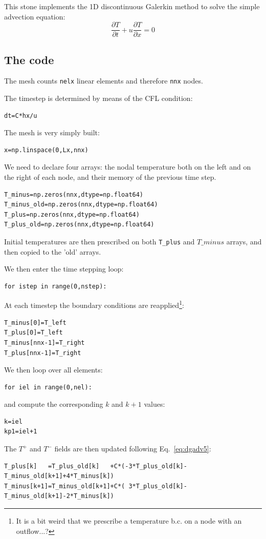

This stone implements the 1D discontinuous Galerkin method to solve the simple 
advection equation:
\[
\frac{\partial T}{\partial t} + u \frac{\partial T}{\partial x} = 0
\]




\subsection*{The code}

The mesh counts {\tt nelx} linear elements and therefore {\tt nnx} nodes.

The timestep is determined by means of the CFL condition:
\begin{lstlisting}
dt=C*hx/u
\end{lstlisting}
The mesh is very simply built:
\begin{lstlisting}
x=np.linspace(0,Lx,nnx)
\end{lstlisting}
We need to declare four arrays: the nodal temperature both on the left and 
on the right of each node, and their memory of the previous time step. 
\begin{lstlisting}
T_minus=np.zeros(nnx,dtype=np.float64)      
T_minus_old=np.zeros(nnx,dtype=np.float64)  
T_plus=np.zeros(nnx,dtype=np.float64)       
T_plus_old=np.zeros(nnx,dtype=np.float64)   
\end{lstlisting}
Initial temperatures are then prescribed on both {\tt T\_plus} 
and $T\_minus$ arrays, and then copied to the 'old' arrays.

We then enter the time stepping loop:
\begin{lstlisting}
for istep in range(0,nstep):
\end{lstlisting}
At each timestep the boundary conditions are reapplied\footnote{It is a bit weird that 
we prescribe a temperature b.c. on a node with an outflow...?}:
\begin{lstlisting}
T_minus[0]=T_left
T_plus[0]=T_left
T_minus[nnx-1]=T_right
T_plus[nnx-1]=T_right
\end{lstlisting}
We then loop over all elements:
\begin{lstlisting}
for iel in range(0,nel):
\end{lstlisting}
and compute the corresponding $k$ and $k+1$ values:
\begin{lstlisting}
k=iel
kp1=iel+1
\end{lstlisting}
The $T^+$ and $T^-$ fields are then updated following Eq.~\eqref{eq:dgadv5}:
\begin{lstlisting}
T_plus[k]   =T_plus_old[k]   +C*(-3*T_plus_old[k]-T_minus_old[k+1]+4*T_minus[k])
T_minus[k+1]=T_minus_old[k+1]+C*( 3*T_plus_old[k]-T_minus_old[k+1]-2*T_minus[k])
\end{lstlisting}







